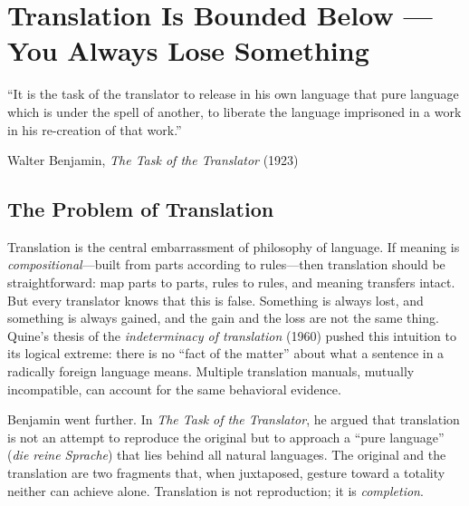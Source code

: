 

\chapter{Translation Is Bounded Below --- You Always Lose Something}
\label{ch:translation-loss}

\epigraph{``It is the task of the translator to release in his own language
that pure language which is under the spell of another, to liberate the
language imprisoned in a work in his re-creation of that work.''}{Walter
Benjamin, \textit{The Task of the Translator} (1923)}

\section{The Problem of Translation}

Translation is the central embarrassment of philosophy of language.  If meaning
is \emph{compositional}---built from parts according to rules---then translation
should be straightforward: map parts to parts, rules to rules, and meaning
transfers intact.  But every translator knows that this is false.  Something is
always lost, and something is always gained, and the gain and the loss are not
the same thing.  Quine's thesis of the \emph{indeterminacy of translation}
(1960) pushed this intuition to its logical extreme: there is no ``fact of the
matter'' about what a sentence in a radically foreign language means.  Multiple
translation manuals, mutually incompatible, can account for the same behavioral
evidence.

Benjamin went further.  In \emph{The Task of the Translator}, he argued that
translation is not an attempt to reproduce the original but to approach a
``pure language'' (\textit{die reine Sprache}) that lies behind all natural
languages.  The original and the translation are two fragments that, when
juxtaposed, gesture toward a totality neither can achieve alone.  Translation
is not reproduction; it is \emph{completion}.

